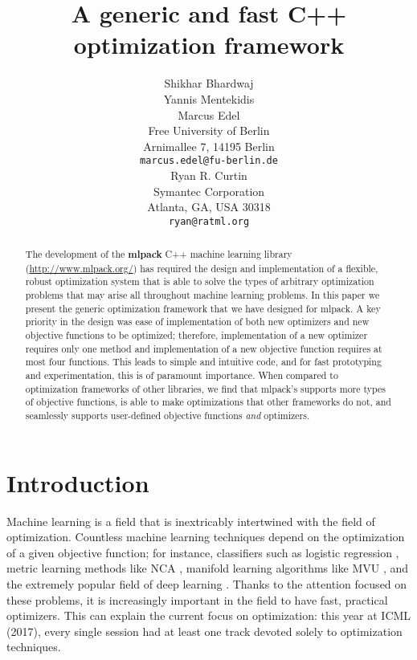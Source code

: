 \documentclass{article}
\title{A generic and fast C++ optimization framework}
\author{
  Shikhar Bhardwaj \\
  \AND
  Yannis Mentekidis \\
  \AND
  Marcus Edel \\
  Free University of Berlin \\
  Arnimallee 7, 14195 Berlin \\
  \texttt{marcus.edel@fu-berlin.de} \\
  \AND
  Ryan R. Curtin \\
  Symantec Corporation \\
  Atlanta, GA, USA 30318 \\
  \texttt{ryan@ratml.org} \\
}
\begin{document}

\maketitle

\begin{abstract}
The development of the {\bf mlpack} C++ machine learning library
(\url{http://www.mlpack.org/}) has required the design and implementation of a
flexible, robust optimization system that is able to solve the types of
arbitrary optimization problems that may arise all throughout machine learning
problems.  In this paper we present the generic optimization framework that we
have designed for mlpack.  A key priority in the design was ease of
implementation of both new optimizers and new objective functions to be
optimized; therefore, implementation of a new optimizer requires only one
method and implementation of a new objective function requires at most four
functions.  This leads to simple and intuitive code, and for fast prototyping
and experimentation, this is of paramount importance.  When compared to
optimization frameworks of other libraries, we find that mlpack's supports more
types of objective functions, is able to make optimizations that other
frameworks do not, and seamlessly supports user-defined objective functions
{\it and} optimizers.
%
\end{abstract}

\section{Introduction}

Machine learning is a field that is inextricably intertwined with the field of
optimization.  Countless machine learning techniques depend on the optimization
of a given objective function; for instance, classifiers such as logistic
regression \cite{cox1958regression}, metric learning methods like NCA
\cite{goldberger2005neighbourhood}, manifold learning algorithms like MVU
\cite{weinberger2006introduction}, and the extremely popular field of deep
learning \cite{schmidhuber2015deep}.  Thanks to the attention focused on these
problems, it is increasingly important in the field to have fast, practical
optimizers.  This can explain the current focus on optimization: this year at
ICML (2017), every single session had at least one track devoted solely to
optimization techniques.
\end{document}
